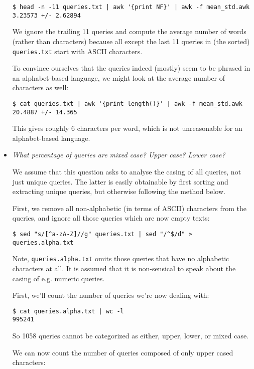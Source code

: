 \begin{itemize}
\begin{lstlisting}
$ head -n -11 queries.txt | awk '{print NF}' | awk -f mean_std.awk 
3.23573 +/- 2.62894
\end{lstlisting}

We ignore the trailing 11 queries and compute the average number of words
(rather than characters) because all except the last 11 queries in (the sorted)
\texttt{queries.txt} start with ASCII characters.

To convince ourselves that the queries indeed (mostly) seem to be phrased in an
alphabet-based language, we might look at the average number of characters as
well:

\begin{lstlisting}
$ cat queries.txt | awk '{print length()}' | awk -f mean_std.awk 
20.4887 +/- 14.365
\end{lstlisting}

This gives roughly 6 characters per word, which is not unreasonable for an
alphabet-based language.

\item \emph{What percentage of queries are mixed case? Upper case? Lower case?}

We assume that this question asks to analyse the casing of all queries, not
just unique queries. The latter is easily obtainable by first sorting and
extracting unique queries, but otherwise following the method below.

First, we remove all non-alphabetic (in terms of ASCII) characters from the
queries, and ignore all those queries which are now empty texts:

\begin{lstlisting}
$ sed "s/[^a-zA-Z]//g" queries.txt | sed "/^$/d" > queries.alpha.txt
\end{lstlisting}

Note, \texttt{queries.alpha.txt} omits those queries that have no alphabetic
characters at all. It is assumed that it is non-sensical to speak about the
casing of e.g. numeric queries.

First, we'll count the number of queries we're now dealing with:

\begin{lstlisting}
$ cat queries.alpha.txt | wc -l
995241
\end{lstlisting}

So 1058 queries cannot be categorized as either, upper, lower, or mixed case.

We can now count the number of queries composed of only upper cased characters:


\end{itemize}

